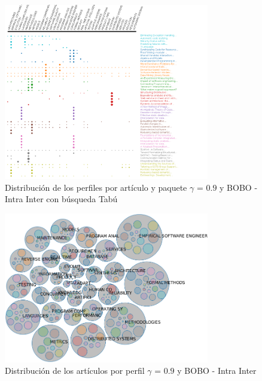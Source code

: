 \begin{figure}[H]
  \centering
    \includegraphics[width=0.8\textwidth]{resultados/papers/BOBO/INTRA_INTER/gamma-with-local-09.png}
  \caption{Distribución de los perfiles por artículo y paquete $\gamma$ = $0.9$ y BOBO - Intra Inter con búsqueda Tabú}
  \label{res:img-papers-gamma09-bobo-intra-inter-tabu}
\end{figure}

\begin{figure}[H]
  \centering
    \includegraphics[width=0.8\textwidth]{resultados/papers/BOBO/INTRA_INTER/bubbles-gamma-09.png}
  \caption{Distribución de los artículos por perfil $\gamma$ = $0.9$ y BOBO - Intra Inter}
  \label{res:img-papers-bubbles-gamma09-bobo-intra-inter}
\end{figure}

